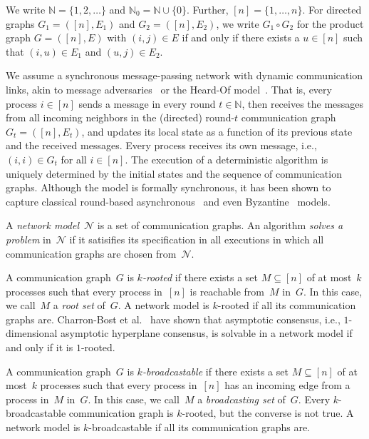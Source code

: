 \documentclass{article}
\newcommand{\N}{\mathcal{N}}
\newcommand{\IN}{\mathbb{N}}
\begin{document}
We write $\IN = \{1,2,\dots\}$ and $\IN_0 = \IN \cup \{0\}$.
Further, $[n] = \{1,\dots, n\}$.
For directed graphs $G_1 = ([n],E_1)$ and $G_2 = ([n],E_2)$, we write
  $G_1 \circ G_2$ for the product graph $G = ([n], E)$ with $(i,j) \in E$
  if and only if there exists a $u \in [n]$ such that $(i,u) \in E_1$ and
  $(u,j) \in E_2$.


We assume a synchronous message-passing network with dynamic communication
links, akin to message adversaries~\cite{afek13:asynchrony} or the Heard-Of
model~\cite{charron09:HO}.
That is, every process $i\in[n]$ sends a message in every round $t\in\IN$,
then receives the messages from all incoming neighbors in the (directed)
round-$t$ communication graph $G_t=([n],E_t)$, and updates its local state as a function
of its previous state and the received messages.
Every process receives its own message, i.e., $(i,i)\in G_t$ for all $i\in[n]$.
The execution of a deterministic algorithm is uniquely determined by the
initial states and the sequence of communication graphs.
Although the model is formally synchronous, it has been shown to capture
classical round-based asynchronous~\cite{charron09:HO} and even
Byzantine~\cite{biely07:tolerating,mendes15:multidimensional} models.

A \emph{network model}~$\N$ is a set of communication graphs.
An algorithm \emph{solves a problem} in~$\N$ if it satisifies its specification
in all executions in which all communication graphs are chosen from~$\N$.

A communication graph~$G$ is \emph{$k$-rooted} if there exists a set
$M\subseteq[n]$ of at most~$k$ processes such that every process in~$[n]$
is reachable from~$M$ in~$G$.
In this case, we call~$M$ a \emph{root set} of~$G$.
A network model is $k$-rooted if all its communication graphs are.
Charron-Bost et al.~\cite{CBFN15:icalp} have shown that asymptotic consensus,
i.e., $1$-dimensional asymptotic hyperplane consensus, is
solvable in a network model if and only if it is $1$-rooted.

A communication graph~$G$ is \emph{$k$-broadcastable} if there exists a set
$M\subseteq[n]$ of at most~$k$ processes such that every process in~$[n]$
has an incoming edge from a process in~$M$ in~$G$.
In this case, we call~$M$ a \emph{broadcasting set} of~$G$.
Every $k$-broadcastable communication graph is $k$-rooted, but the converse is
not true.
A network model is $k$-broadcastable if all its communication graphs are.


\end{document}
